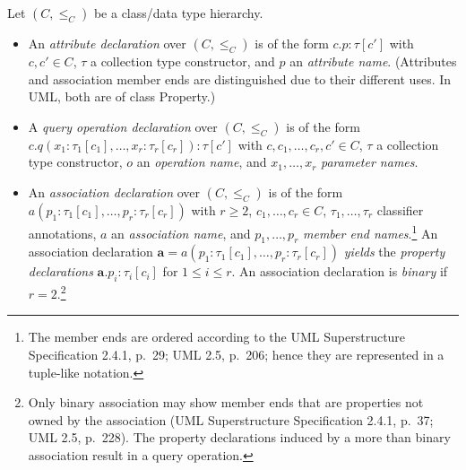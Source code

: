 \documentclass[10pt,fleqn,final]{scrreprt}
\newenvironment{definitions}[0]{\medskip }{}
\newcommand{\uml}[1]{\textsf{#1}}
\begin{document}
\begin{definitions}
\medskip
Let $(C, {\leq_C})$ be a class/data type hierarchy.
%
\begin{itemize}[label={--}, leftmargin=*]
  \item An \emph{attribute declaration} over $(C, {\leq_C})$ is of the form
$c.p : \tau[c']$ with $c, c' \in C$, $\tau$ a collection type
constructor, and $p$ an \emph{attribute name}. ({Attributes
  and association member ends are distinguished due to their different uses.  In UML,
  both are of class \uml{Property}.}) 

  \item A \emph{query operation declaration} over $(C, {\leq_C})$ is of
the form $c.q(x_1 : \tau_1[c_1], \dots, x_r : \tau_r[c_r]) : \tau[c']$
with $c, c_1,\ldots, c_r, c' \in C$, $\tau$ a collection type
constructor, $o$ an \emph{operation name}, and $x_1, \ldots, x_r$
\emph{parameter names}.

\item An \emph{association declaration} over $(C, {\leq_C})$ is of the
form $a(p_1 : \tau_1[c_1], \dots, p_r : \tau_r[c_r])$ with $r \geq 2$,
$c_1, \dots, c_r \in C$, $\tau_1, \ldots, \tau_r$ classifier
annotations, $a$ an \emph{association name}, and $p_1, \dots, p_r$
\emph{member end names}.\footnote{The member ends are ordered according
  to the UML Superstructure Specification 2.4.1, p.~29; UML 2.5, p.~206;
  hence they are represented in a tuple-like notation.}  An association declaration
$\mathbf{a} = a(p_1 : \tau_1[c_1], \ldots, p_r : \tau_r[c_r])$
\emph{yields} the \emph{property declarations}
$\mathbf{a}.p_i : \tau_i[c_i]$ for $1 \leq i \leq r$.  An association
declaration is \emph{binary} if $r = 2$.\footnote{Only binary
  association may show member ends that are properties not owned by the
  association (UML Superstructure Specification 2.4.1, p.~37; UML 2.5,
  p.~228).  The property declarations induced by a more than binary
  association result in a query operation.}


\end{itemize}
\end{definitions}
\end{document}
